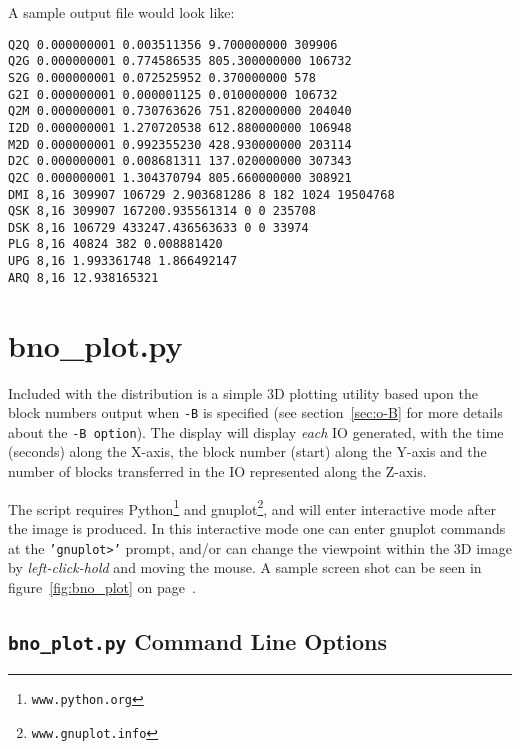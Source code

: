 \documentclass{article}
\begin{document}
  \bigskip
  A sample output file would look like:

  \begin{verbatim}
Q2Q 0.000000001 0.003511356 9.700000000 309906
Q2G 0.000000001 0.774586535 805.300000000 106732
S2G 0.000000001 0.072525952 0.370000000 578
G2I 0.000000001 0.000001125 0.010000000 106732
Q2M 0.000000001 0.730763626 751.820000000 204040
I2D 0.000000001 1.270720538 612.880000000 106948
M2D 0.000000001 0.992355230 428.930000000 203114
D2C 0.000000001 0.008681311 137.020000000 307343
Q2C 0.000000001 1.304370794 805.660000000 308921
DMI 8,16 309907 106729 2.903681286 8 182 1024 19504768
QSK 8,16 309907 167200.935561314 0 0 235708
DSK 8,16 106729 433247.436563633 0 0 33974
PLG 8,16 40824 382 0.008881420
UPG 8,16 1.993361748 1.866492147
ARQ 8,16 12.938165321
  \end{verbatim}

\newpage\section{\label{sec:bno_plot}bno\_plot.py}

Included with the distribution is a simple 3D plotting utility based
upon the block numbers output when \texttt{-B} is specified (see
section~\ref{sec:o-B} for more details about the \texttt{-B option}). The
display will display \emph{each} IO generated, with the time (seconds)
along the X-axis, the block number (start) along the Y-axis and the
number of blocks transferred in the IO represented along the Z-axis.

The script requires Python\footnote{\texttt{www.python.org}} and
gnuplot\footnote{\texttt{www.gnuplot.info}}, and will enter interactive
mode after the image is produced. In this interactive mode one can enter
gnuplot commands at the \texttt{'gnuplot>'} prompt, and/or can change
the viewpoint within the 3D image by \emph{left-click-hold} and moving
the mouse. A sample screen shot can be seen in figure~\ref{fig:bno_plot} on
page~\pageref{fig:bno_plot}.

\subsection*{\texttt{bno\_plot.py} Command Line Options}
\end{document}
